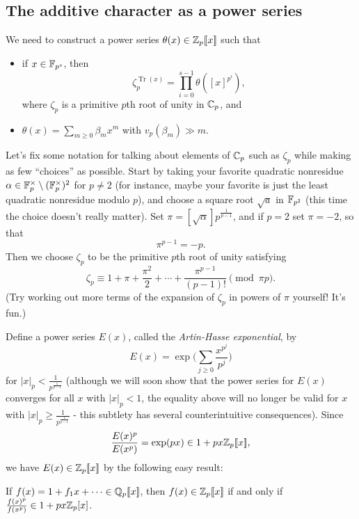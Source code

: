 \documentclass[letterpaper,11pt]{article}
\DeclareMathOperator{\Tr}{Tr}
\begin{document}
\subsection{The additive character as a power series}

We need to construct a power series $\theta(x) \in \mathbb{Z}_p[\![x]\!]$ such that
\begin{itemize}
\item if $x \in \mathbb{F}_{p^s}$, then
\[
\zeta_p^{\Tr(x)} = \prod_{i=0}^{s-1} \theta([x]^{p^i}),
\]
where $\zeta_p$ is a primitive $p$th root of unity in $\mathbb{C}_p$, and

\item $\theta(x) = \sum_{m \ge 0} \beta_m x^m$ with $v_p(\beta_m) \gg m$.
\end{itemize}

Let's fix some notation for talking about elements of $\mathbb{C}_p$ such as $\zeta_p$ while making as few ``choices'' as possible. Start by taking your favorite quadratic nonresidue $\alpha \in \mathbb{F}_p^{\times} \setminus (\mathbb{F}_p^{\times})^2$ for $p \ne 2$ (for instance, maybe your favorite is just the least quadratic nonresidue modulo $p$), and choose a square root $\sqrt{a}$ in $\mathbb{F}_{p^2}$ (this time the choice doesn't really matter). Set $\pi = [\sqrt{\alpha}]p^{\frac{1}{p-1}}$, and if $p = 2$ set $\pi = -2$, so that
\[
\pi^{p-1} = -p.
\]
Then we choose $\zeta_p$ to be the primitive $p$th root of unity satisfying
\[
\zeta_p \equiv 1 + \pi + \frac{\pi^2}{2} + \cdots + \frac{\pi^{p-1}}{(p-1)!} \pmod{\pi p}.
\]
(Try working out more terms of the expansion of $\zeta_p$ in powers of $\pi$ yourself! It's fun.)

Define a power series $E(x)$, called the \emph{Artin-Hasse exponential}, by
\[
E(x) = \exp\Big(\sum_{j \ge 0} \frac{x^{p^j}}{p^j}\Big)
\]
for $|x|_p < \frac{1}{p^{\frac{1}{p-1}}}$ (although we will soon show that the power series for $E(x)$ converges for all $x$ with $|x|_p < 1$, the equality above will no longer be valid for $x$ with $|x|_p \ge \frac{1}{p^{\frac{1}{p-1}}}$ - this subtlety has several counterintuitive consequences). Since
\[
\frac{E(x)^p}{E(x^p)} = \exp(px) \in 1 + px\mathbb{Z}_p[\![x]\!],
\]
we have $E(x) \in \mathbb{Z}_p[\![x]\!]$ by the following easy result:

\begin{lem} If $f(x) = 1 + f_1x + \cdots \in \mathbb{Q}_p[\![x]\!]$, then $f(x) \in \mathbb{Z}_p[\![x]\!]$ if and only if $\frac{f(x)^p}{f(x^p)} \in 1 + px\mathbb{Z}_p[x]$.
\end{lem}
\end{document}
